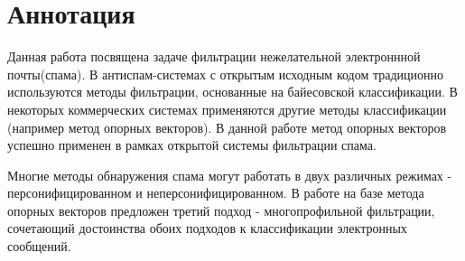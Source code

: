 \newpage
\section{Аннотация}

Данная работа посвящена задаче фильтрации нежелательной электроннной почты(спама). В антиспам-системах с открытым исходным кодом традиционно используются методы фильтрации, основанные на байесовской классификации. В некоторых коммерческих системах применяются другие методы классификации (например метод опорных векторов). В данной работе метод опорных векторов успешно применен в рамках открытой системы фильтрации спама.

Многие методы обнаружения спама могут работать в двух различных режимах - персонифицированном и неперсонифицированном. В работе на базе метода опорных векторов предложен третий подход - многопрофильной фильтрации, сочетающий достоинства обоих подходов к классификации электронных сообщений.
